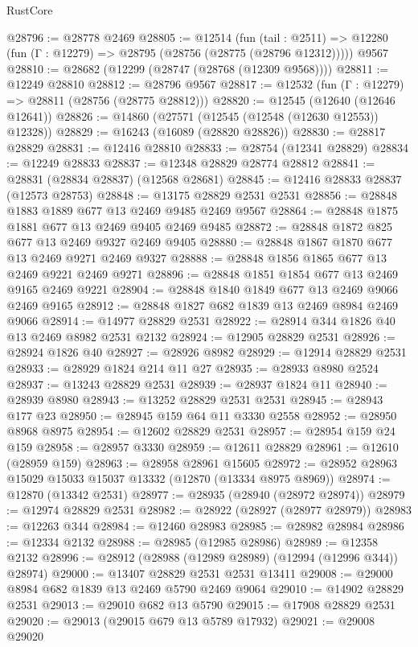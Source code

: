 \begin{lexlean}{RustCore}
\begin{coremodule}
@28796 := @28778 @2469
@28805 := @12514
    (fun (tail : @2511) => @12280 (fun (Γ : @12279) => @28795 (@28756 (@28775 (@28796 @12312)))))
    @9567
@28810 := @28682 (@12299 (@28747 (@28768 (@12309 @9568))))
@28811 := @12249 @28810
@28812 := @28796 @9567
@28817 := @12532 (fun (Γ : @12279) => @28811 (@28756 (@28775 @28812)))
@28820 := @12545 (@12640 (@12646 @12641))
@28826 := @14860 (@27571 (@12545 (@12548 (@12630 @12553)) @12328))
@28829 := @16243 (@16089 (@28820 @28826))
@28830 := @28817 @28829
@28831 := @12416 @28810
@28833 := @28754 (@12341 @28829)
@28834 := @12249 @28833
@28837 := @12348 @28829 @28774 @28812
@28841 := @28831 (@28834 @28837) (@12568 @28681)
@28845 := @12416 @28833 @28837 (@12573 @28753)
@28848 := @13175 @28829 @2531 @2531
@28856 := @28848 @1883 @1889 @677 @13 @2469 @9485 @2469 @9567
@28864 := @28848 @1875 @1881 @677 @13 @2469 @9405 @2469 @9485
@28872 := @28848 @1872 @825 @677 @13 @2469 @9327 @2469 @9405
@28880 := @28848 @1867 @1870 @677 @13 @2469 @9271 @2469 @9327
@28888 := @28848 @1856 @1865 @677 @13 @2469 @9221 @2469 @9271
@28896 := @28848 @1851 @1854 @677 @13 @2469 @9165 @2469 @9221
@28904 := @28848 @1840 @1849 @677 @13 @2469 @9066 @2469 @9165
@28912 := @28848 @1827 @682 @1839 @13 @2469 @8984 @2469 @9066
@28914 := @14977 @28829 @2531
@28922 := @28914 @344 @1826 @40 @13 @2469 @8982 @2531 @2132
@28924 := @12905 @28829 @2531
@28926 := @28924 @1826 @40
@28927 := @28926 @8982
@28929 := @12914 @28829 @2531
@28933 := @28929 @1824 @214 @11 @27
@28935 := @28933 @8980 @2524
@28937 := @13243 @28829 @2531
@28939 := @28937 @1824 @11
@28940 := @28939 @8980
@28943 := @13252 @28829 @2531 @2531
@28945 := @28943 @177 @23
@28950 := @28945 @159 @64 @11 @3330 @2558
@28952 := @28950 @8968 @8975
@28954 := @12602 @28829 @2531
@28957 := @28954 @159 @24 @159
@28958 := @28957 @3330
@28959 := @12611 @28829
@28961 := @12610 (@28959 @159)
@28963 := @28958 @28961 @15605
@28972 := @28952 @28963 @15029 @15033 @15037 @13332 (@12870 (@13334 @8975 @8969))
@28974 := @12870 (@13342 @2531)
@28977 := @28935 (@28940 (@28972 @28974))
@28979 := @12974 @28829 @2531
@28982 := @28922 (@28927 (@28977 @28979))
@28983 := @12263 @344
@28984 := @12460 @28983
@28985 := @28982 @28984
@28986 := @12334 @2132
@28988 := @28985 (@12985 @28986)
@28989 := @12358 @2132
@28996 := @28912 (@28988 (@12989 @28989) (@12994 (@12996 @344)) @28974)
@29000 := @13407 @28829 @2531 @2531 @13411
@29008 := @29000 @8984 @682 @1839 @13 @2469 @5790 @2469 @9064
@29010 := @14902 @28829 @2531
@29013 := @29010 @682 @13 @5790
@29015 := @17908 @28829 @2531
@29020 := @29013 (@29015 @679 @13 @5789 @17932)
@29021 := @29008 @29020

\end{coremodule}
\end{lexlean}
